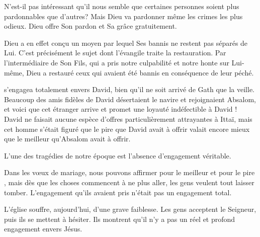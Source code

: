 N'est-il pas intéressant qu'il nous semble que certaines personnes
 soient plus pardonnables que d'autres?
 Mais Dieu va pardonner même les crimes les plus odieux.
 Dieu offre Son pardon et Sa grâce gratuitement. 


Dieu a en effet conçu un moyen par lequel \og Ses bannis \fg{}
 ne restent pas séparés de Lui.
 C'est précisément le sujet dont l'évangile traite \ocadr la restauration.
 Par l'intermédiaire de Son Fils, qui a pris notre culpabilité et notre honte
 sur Lui-même, Dieu a restauré ceux qui avaient été bannis en conséquence
 de leur péché. 

\dvrule






 s'engagea totalement envers David,
 bien qu'il ne soit arrivé de Gath que la veille.
 Beaucoup des amis fidèles de David désertaient le navire
 et rejoignaient Absalom, et voici que cet étranger arrive
 et promet une loyauté indéfectible à David !
 David ne faisait aucune espèce d'offres particulièrement attrayantes
 à Ittaï, mais cet homme s'était figuré que le pire que David avait
 à offrir valait encore mieux que le meilleur qu'Absalom avait à offrir.

L'une des tragédies de notre époque est l'absence d'engagement véritable. 


Dans les v\oe{}ux de mariage, nous pouvons affirmer
 \og pour le meilleur et pour le pire \fg{}, mais dès que les choses
 commencent à ne plus aller, les gens veulent tout laisser tomber.
 L'engagement qu'ils avaient pris n'était pas un engagement total. 

L'église 
 souffre, aujourd'hui, d'une grave faiblesse.
 Les gens acceptent le Seigneur, puis ils se mettent à hésiter.
 Ils montrent qu'il n'y a pas un réel et profond engagement envers Jésus.

